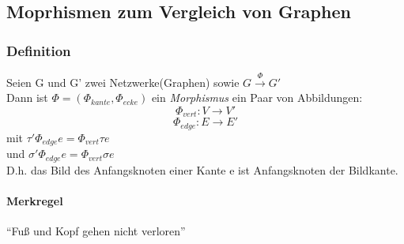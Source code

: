 \subsection{Moprhismen zum Vergleich von Graphen}
\subsubsection{Definition}
Seien G und G' zwei Netzwerke(Graphen) sowie $G \overset{\Phi}{\rightarrow} G'$ 
\\Dann ist $\Phi  = (\Phi_{kante}, \Phi_{ecke})$  ein \emph{Morphismus} ein Paar von Abbildungen:
$$ \Phi_{vert}: V \rightarrow V'$$
$$\Phi_{edge}: E \rightarrow E'$$
mit $\tau' \Phi_{edge} e = \Phi_{vert} \tau e$
\\und $ {\sigma '}  \Phi_{edge} e = \Phi_{vert} \sigma e$
\\D.h. das Bild des Anfangsknoten einer Kante e ist Anfangsknoten der Bildkante.
\paragraph{Merkregel}``Fuß und Kopf gehen nicht verloren''





